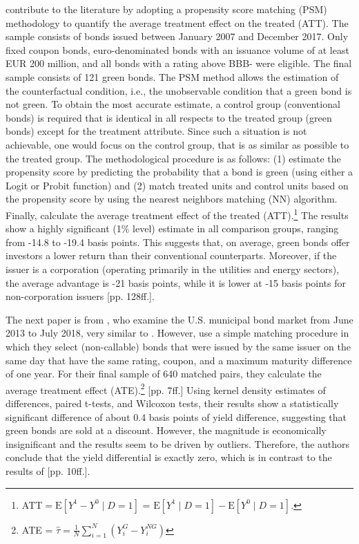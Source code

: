 \citet{gianfrate2019green} contribute to the literature by adopting a propensity score matching (PSM) methodology to quantify the average treatment effect on the treated (ATT). The sample consists of bonds issued between January 2007 and December 2017. Only fixed coupon bonds, euro-denominated bonds with an issuance volume of at least EUR 200 million, and all bonds with a rating above BBB- were eligible. The final sample consists of 121 green bonds. The PSM method allows the estimation of the counterfactual condition, i.e., the unobservable condition that a green bond is not green. To obtain the most accurate estimate, a control group (conventional bonds) is required that is identical in all respects to the treated group (green bonds) except for the treatment attribute. Since such a situation is not achievable, one would focus on the control group, that is as similar as possible to the treated group. The methodological procedure is as follows: (1) estimate the propensity score by predicting the probability that a bond is green (using either a Logit or Probit function) and (2) match treated units and control units based on the propensity score by using the nearest neighbors matching (NN) algorithm. Finally, calculate the average treatment effect of the treated (ATT).\footnote{ATT$=\mathrm{E}\left[Y^1-Y^0 \mid D=1\right]$ = $\mathrm{E}\left[Y^1 \mid D=1\right]-\mathrm{E}\left[Y^0 \mid D=1\right]$.} The results show a highly significant (1\% level) estimate in all comparison groups, ranging from -14.8 to -19.4 basis points. This suggests that, on average, green bonds offer investors a lower return than their conventional counterparts. Moreover, if the issuer is a corporation (operating primarily in the utilities and energy sectors), the average advantage is -21 basis points, while it is lower at -15 basis points for non-corporation issuers [pp. 128ff.].

The next paper is from \citet{larcker2020s}, who examine the U.S. municipal bond market from June 2013 to July 2018, very similar to \citet{partridge2018green}. However, \citet{larcker2020s} use a simple matching procedure in which they select (non-callable) bonds that were issued by the same issuer on the same day that have the same rating, coupon, and a maximum maturity difference of one year. For their final sample of 640 matched pairs, they calculate the average treatment effect (ATE).\footnote{ATE = $\hat{\tau}=\frac{1}{N}\sum_{i=1}^{N}(Y_i^{G}-Y_i^{NG})$} [pp. 7ff.] Using kernel density estimates of differences, paired t-tests, and Wilcoxon tests, their results show a statistically significant difference of about 0.4 basis points of yield difference, suggesting that green bonds are sold at a discount. However, the magnitude is economically insignificant and the results seem to be driven by outliers. Therefore, the authors conclude that the yield differential is exactly zero, which is in contrast to the results of \citet{partridge2018green} [pp. 10ff.].

